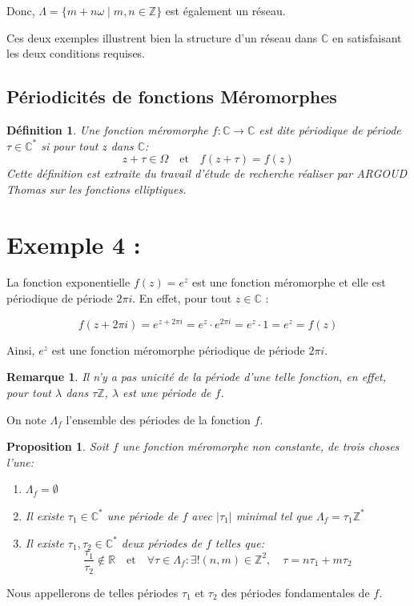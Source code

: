 \documentclass[12pt]{article}
\newtheorem{remark}{Remarque}
\newtheorem{definition}{Définition}
\newtheorem{proposition}{Proposition}
\begin{document}
Donc, \(\Lambda = \{ m + n\omega \mid m, n \in \mathbb{Z} \}\) est également un réseau.

Ces deux exemples illustrent bien la structure d'un réseau dans \(\mathbb{C}\) en satisfaisant les deux conditions requises.
\subsection{Périodicités de fonctions Méromorphes}
\begin{definition}	
 \quad Une fonction méromorphe \( f: \mathbb{C} \to \mathbb{C} \) est dite \textit{périodique de période} \( \tau \in \mathbb{C}^* \) si pour tout \( z \) dans \( \mathbb{C} \):
\[ 
z + \tau \in \Omega \quad \text{et} \quad f(z + \tau) = f(z) 
\]
\textit{Cette définition est extraite du travail d'étude de recherche réaliser par ARGOUD Thomas sur les fonctions elliptiques.}
\end{definition}
\section*{Exemple 4 : }

La fonction exponentielle \( f(z) = e^z \) est une fonction méromorphe et elle est périodique de période \( 2\pi i \). En effet, pour tout \( z \in \mathbb{C} \) :

\[
f(z + 2\pi i) = e^{z + 2\pi i} = e^z \cdot e^{2\pi i} = e^z \cdot 1 = e^z = f(z)
\]

Ainsi, \( e^z \) est une fonction méromorphe périodique de période \( 2\pi i \).

\begin{remark}
 Il n'y a pas unicité de la période d'une telle fonction, en effet, pour tout \( \lambda \) dans \( \tau \mathbb{Z} \), \( \lambda\) est une période de \( f \).
 \end{remark}
On note \( \Lambda_f \) l'ensemble des périodes de la fonction \( f \).

\begin{proposition}
Soit \( f \) une fonction méromorphe non constante, de trois choses l'une:

    
 
\begin{enumerate}
    \item \( \Lambda_f = \emptyset \)
    \item Il existe \( \tau_1 \in \mathbb{C}^* \) une période de \( f \) avec \( |\tau_1| \) minimal tel que \( \Lambda_f = \tau_1 \mathbb{Z}^* \)
    \item Il existe \( \tau_1, \tau_2 \in \mathbb{C}^* \) deux périodes de \( f \) telles que:
    \[
    \frac{\tau_1}{\tau_2} \notin \mathbb{R} \quad \text{et} \quad \forall \tau \in \Lambda_f:  \exists! (n, m) \in \mathbb{Z}^2, \quad \tau = n\tau_1 + m\tau_2
    \]
\end{enumerate}
\end{proposition}
Nous appellerons de telles périodes \( \tau_1 \) et \( \tau_2 \) des périodes fondamentales de \( f \).
	
\end{document}
